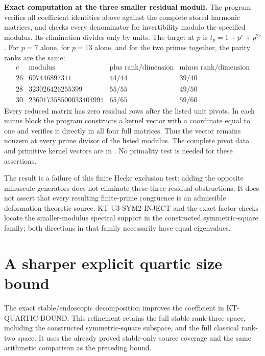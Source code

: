 \documentclass[11pt,a4paper]{article}
\theoremstyle{definition}
\renewcommand{\paragraph}[1]{\par\smallskip\noindent\textbf{#1}\quad\ignorespaces}
\begin{document}
\paragraph{Exact computation at the three smaller residual moduli.}
The program  verifies all coefficient
identities above against the complete stored harmonic matrices,
and checks every denominator for invertibility modulo the
specified modulus.  Its elimination divides only by units.
The target at $p$ is $t_p=1+p^e+p^{2e}$.
For $p=7$ alone, for $p=13$ alone, and for the two primes
together, the parity ranks are the same:
\[
\begin{array}{c|r|c|c}
e&\text{modulus}&\text{plus rank/dimension}&
                         \text{minus rank/dimension}\\\hline
26&697446897311&44/44&39/40\\
28&323026426255399&55/55&49/50\\
30&236017358500033404991&65/65&59/60
\end{array}
\]
Every reduced matrix has zero residual rows after the listed
unit pivots.  In each minus block the program constructs a
kernel vector with a coordinate equal to one and verifies it
directly in all four full matrices.  Thus the vector remains
nonzero at every prime divisor of the listed modulus.
The complete pivot data and primitive kernel vectors are in
.  No primality test is needed
for these assertions.

The result is a failure of this finite Hecke exclusion test:
adding the opposite minuscule generators does not eliminate
these three residual obstructions.  It does not assert that
every resulting finite-prime congruence is an admissible
deformation-theoretic source.  KT-U3-SYM2-INJECT and the exact
factor checks locate the smaller-modulus spectral support in
the constructed symmetric-square family; both directions in
that family necessarily have equal eigenvalues.



\section{A sharper explicit quartic size bound}
\label{sec:kt-quartic-refinement}

The exact stable/endoscopic decomposition improves the coefficient
in KT-QUARTIC-BOUND.  This refinement retains the full stable
rank-three space, including the constructed symmetric-square
subspace, and the full classical rank-two space.  It uses the
already proved stable-only source coverage and the same arithmetic
comparison as the preceding bound.
\end{document}
